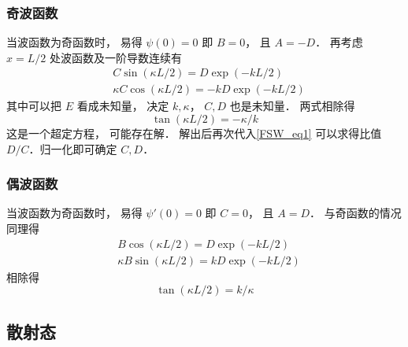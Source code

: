 \subsubsection{奇波函数}
当波函数为奇函数时， 易得 $\psi(0) = 0$ 即 $B = 0$， 且 $A = -D$． 再考虑 $x = L/2$ 处波函数及一阶导数连续有
\begin{equation}\label{FSW_eq1}
\begin{aligned}
&C\sin(\kappa L/2) = D \exp(-kL/2)\\
&\kappa C \cos(\kappa L/2) = -kD \exp(-kL/2)
\end{aligned}
\end{equation}
其中可以把 $E$ 看成未知量， 决定 $k, \kappa$， $C,D$ 也是未知量． 两式相除得
\begin{equation}\label{FSW_eq2}
\tan(\kappa L/2) = -\kappa/k
\end{equation}
这是一个超定方程， 可能存在解． 解出后再次代入\autoref{FSW_eq1} 可以求得比值 $D/C$．归一化即可确定 $C, D$．

\subsubsection{偶波函数}
当波函数为奇函数时， 易得 $\psi'(0) = 0$ 即 $C = 0$， 且 $A = D$． 与奇函数的情况同理得
\begin{equation}
\begin{aligned}
&B\cos(\kappa L/2) = D \exp(-kL/2)\\
&\kappa B \sin(\kappa L/2) = kD \exp(-kL/2)
\end{aligned}
\end{equation}
相除得
\begin{equation}\label{FSW_eq3}
\tan(\kappa L/2) = k/\kappa
\end{equation}


\subsection{散射态}

